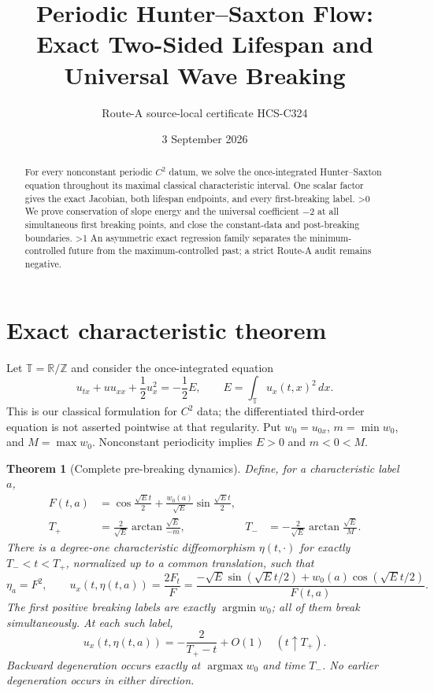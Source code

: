 \documentclass[10pt]{article}
\title{Periodic Hunter--Saxton Flow:\\Exact Two-Sided Lifespan and Universal Wave Breaking}
\author{Route-A source-local certificate HCS-C324}
\date{3 September 2026}
\providecommand{\CRevisionRound}{2}
\newtheorem{theorem}{Theorem}
\newcommand{\TT}{\mathbb T}
\begin{document}
\maketitle
\begin{abstract}
For every nonconstant periodic $C^2$ datum, we solve the once-integrated
Hunter--Saxton equation throughout its maximal classical characteristic
interval.  One scalar factor gives the exact Jacobian, both lifespan
endpoints, and every first-breaking label.
\ifnum\CRevisionRound>0
We prove conservation of slope energy and the universal coefficient
$-2$ at all simultaneous first breaking points, and close the constant-data
and post-breaking boundaries.
\fi
\ifnum\CRevisionRound>1
An asymmetric exact regression family separates the minimum-controlled
future from the maximum-controlled past; a strict Route-A audit remains
negative.
\fi
\end{abstract}

\section{Exact characteristic theorem}
Let $\TT=\mathbb R/\mathbb Z$ and consider the once-integrated equation
\begin{equation}\label{eq:HS}
 u_{tx}+u u_{xx}+\frac12u_x^2=-\frac12E,
 \qquad E=\int_{\TT}u_x(t,x)^2\,dx.
\end{equation}
This is our classical formulation for $C^2$ data; the differentiated
third-order equation is not asserted pointwise at that regularity.  Put
$w_0=u_{0x}$, $m=\min w_0$, and $M=\max w_0$.  Nonconstant periodicity
implies $E>0$ and $m<0<M$.

\begin{theorem}[Complete pre-breaking dynamics]\label{thm:main}
Define, for a characteristic label $a$,
\begin{align}
 F(t,a)&=\cos\frac{\sqrt E t}{2}
   +\frac{w_0(a)}{\sqrt E}\sin\frac{\sqrt E t}{2},\label{eq:F}\\
 T_+&=\frac2{\sqrt E}\arctan\frac{\sqrt E}{-m},
 &T_-&=-\frac2{\sqrt E}\arctan\frac{\sqrt E}{M}.\label{eq:T}
\end{align}
There is a degree-one characteristic diffeomorphism $\eta(t,\cdot)$ for
exactly $T_-<t<T_+$, normalized up to a common translation, such that
\begin{equation}\label{eq:formulas}
 \eta_a=F^2,\qquad
 u_x(t,\eta(t,a))=\frac{2F_t}{F}
 =\frac{-\sqrt E\sin(\sqrt E t/2)+w_0(a)\cos(\sqrt E t/2)}{F(t,a)}.
\end{equation}
The first positive breaking labels are exactly $\operatorname*{argmin}w_0$;
all of them break simultaneously.  At each such label,
\begin{equation}\label{eq:rate}
 u_x(t,\eta(t,a))=-\frac2{T_+-t}+O(1)
 \quad(t\uparrow T_+).
\end{equation}
Backward degeneration occurs exactly at $\operatorname*{argmax}w_0$ and
time $T_-$.  No earlier degeneration occurs in either direction.
\end{theorem}
\end{document}
